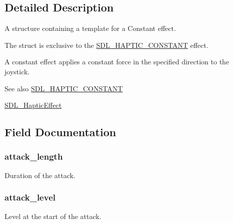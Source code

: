 \subsection{Detailed Description}
A structure containing a template for a Constant effect. 

The struct is exclusive to the \hyperlink{_s_d_l__haptic_8h_a955fb9f680dcf9cc72a3d5263e85b80a}{S\+D\+L\+\_\+\+H\+A\+P\+T\+I\+C\+\_\+\+C\+O\+N\+S\+T\+A\+NT} effect.

A constant effect applies a constant force in the specified direction to the joystick.

\begin{DoxySeeAlso}{See also}
\hyperlink{_s_d_l__haptic_8h_a955fb9f680dcf9cc72a3d5263e85b80a}{S\+D\+L\+\_\+\+H\+A\+P\+T\+I\+C\+\_\+\+C\+O\+N\+S\+T\+A\+NT} 

\hyperlink{union_s_d_l___haptic_effect}{S\+D\+L\+\_\+\+Haptic\+Effect} 
\end{DoxySeeAlso}


\subsection{Field Documentation}
\subsubsection[{\texorpdfstring{attack\+\_\+length}{attack_length}}]{ attack\+\_\+length}\hypertarget{struct_s_d_l___haptic_constant_ac1af5d594e082747b14fa520f74764c0}{}\label{struct_s_d_l___haptic_constant_ac1af5d594e082747b14fa520f74764c0}
Duration of the attack. 
\subsubsection[{\texorpdfstring{attack\+\_\+level}{attack_level}}]{ attack\+\_\+level}\hypertarget{struct_s_d_l___haptic_constant_accde1dae084b0e3b5027c7731cde9080}{}\label{struct_s_d_l___haptic_constant_accde1dae084b0e3b5027c7731cde9080}
Level at the start of the attack. 
